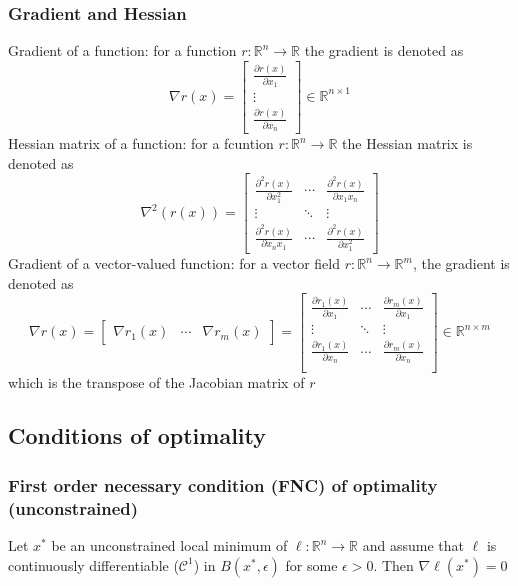 \documentclass{book}
\newcommand{\R}{\mathbb{R}}
\theoremstyle{definition}
\theoremstyle{remark}
\theoremstyle{remark}
\begin{document}
\subsubsection{Gradient and Hessian}
Gradient of a function: for a function $r:\R^n\to\R$  the gradient is denoted as 
\[
    \nabla r(x) = \begin{bmatrix}
        \displaystyle\frac{\partial r(x)}{\partial x_1} \\ \vdots \\ \displaystyle\frac{\partial r(x)}{\partial x_n}
    \end{bmatrix} \in \R^{n\times 1}
\]
Hessian matrix of a function: for a fcuntion $r:\R^n\to\R$  the Hessian matrix is denoted as 
\[
    \nabla^2(r(x)) = \begin{bmatrix}
        \displaystyle\frac{\partial^2 r(x)}{\partial x_1^2} & \cdots & \displaystyle\frac{\partial^2 r(x)}{\partial x_1x_n} \\ \vdots & \ddots & \vdots \\ \displaystyle\frac{\partial^2 r(x)}{\partial x_nx_1} & \cdots & \displaystyle\frac{\partial^2 r(x)}{\partial x_1^2}
    \end{bmatrix}
\]
Gradient of a vector-valued function: for a vector field $r:\R^n\to\R^m$, the gradient is denoted as 
\[
    \nabla r(x) = \begin{bmatrix}
        \nabla r_1(x) & \cdots & \nabla r_m(x)
        \end{bmatrix} = \begin{bmatrix}
        \displaystyle\frac{\partial r_1(x)}{\partial x_1} & \cdots & \displaystyle\frac{\partial r_m(x)}{\partial x_1} \\
        \vdots & \ddots & \vdots \\
        \displaystyle\frac{\partial r_1(x)}{\partial x_n} & \cdots & \displaystyle\frac{\partial r_m(x)}{\partial x_n} \\
    \end{bmatrix} \in \R^{n\times m}
\]
which is the transpose of the Jacobian matrix of $r$
\subsection{Conditions of optimality}
\subsubsection{First order necessary condition (FNC) of optimality (unconstrained)}
Let $x^*$ be an unconstrained local minimum of $\ell:\R^n\to\R$ and assume that $\ell$ is continuously differentiable ($\mathcal{C}^1$) in $B(x^*,\epsilon)$ for some $\epsilon>0$. Then $\nabla \ell(x^*)=0$
\end{document}
